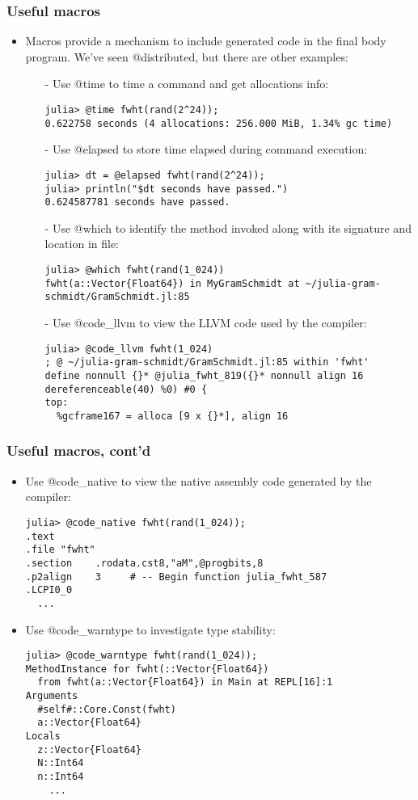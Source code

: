 \documentclass[t,usepdftitle=false]{beamer}
\begin{document}
\begin{frame}[fragile]
\frametitle{Useful macros}
\begin{itemize}
\item Macros provide a mechanism to include generated code in the final body program.
We've seen @distributed, but there are other examples:
\begin{itemize}\normalsize
\item[-] Use @time to time a command and get allocations info:
\begin{verbatim}
julia> @time fwht(rand(2^24));
0.622758 seconds (4 allocations: 256.000 MiB, 1.34% gc time)
\end{verbatim}
\item[-] Use @elapsed to store time elapsed during command execution:
\begin{verbatim}
julia> dt = @elapsed fwht(rand(2^24));
julia> println("$dt seconds have passed.")
0.624587781 seconds have passed.
\end{verbatim}
\item[-] Use @which to identify the method invoked along with its signature and location in file:
\begin{verbatim}
julia> @which fwht(rand(1_024))
fwht(a::Vector{Float64}) in MyGramSchmidt at ~/julia-gram-schmidt/GramSchmidt.jl:85
\end{verbatim}
\item[-] Use @code\_llvm to view the LLVM code used by the compiler:
\begin{verbatim}
julia> @code_llvm fwht(1_024)
; @ ~/julia-gram-schmidt/GramSchmidt.jl:85 within 'fwht'
define nonnull {}* @julia_fwht_819({}* nonnull align 16 dereferenceable(40) %0) #0 {
top:
  %gcframe167 = alloca [9 x {}*], align 16
\end{verbatim}
\end{itemize}
\end{itemize}
\end{frame}

\begin{frame}[fragile]
\frametitle{Useful macros, cont'd}
\begin{itemize}
\item Use @code\_native to view the native assembly code generated by the compiler:
\begin{verbatim}
julia> @code_native fwht(rand(1_024));
.text
.file "fwht"
.section    .rodata.cst8,"aM",@progbits,8
.p2align    3     # -- Begin function julia_fwht_587
.LCPI0_0
  ...
\end{verbatim}
\item Use @code\_warntype to investigate type stability:
\begin{verbatim}
julia> @code_warntype fwht(rand(1_024));
MethodInstance for fwht(::Vector{Float64})
  from fwht(a::Vector{Float64}) in Main at REPL[16]:1
Arguments
  #self#::Core.Const(fwht)
  a::Vector{Float64}
Locals
  z::Vector{Float64}
  N::Int64
  n::Int64
    ...
\end{verbatim}
\end{itemize}
\end{frame}
\end{document}

